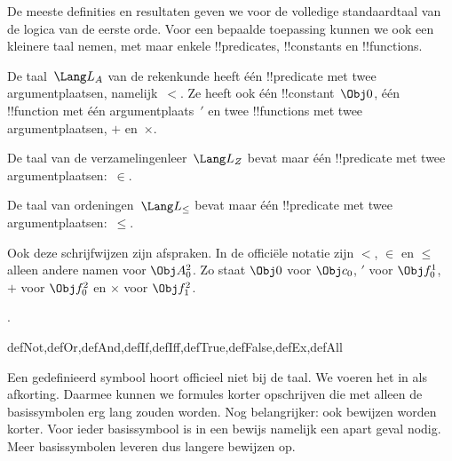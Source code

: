 \documentclass[../../../include/open-logic-section]{subfiles}
\begin{document}
De meeste definities en resultaten geven we voor de volledige
standaardtaal van de logica van de eerste orde. Voor een bepaalde
toepassing kunnen we ook een kleinere taal nemen, met maar enkele
!!{predicate}s, !!{constant}s en !!{function}s.

\begin{ex}
De taal~$\Lang L_A$ van de rekenkunde heeft één !!{predicate} met twee
argumentplaatsen, namelijk~$<$. Ze heeft ook één !!{constant}~$\Obj 0$,
één !!{function} met één argumentplaats~$\prime$ en twee !!{function}s
met twee argumentplaatsen, $+$ en~$\times$.
\end{ex}

\begin{ex}
De taal van de verzamelingenleer~$\Lang L_Z$ bevat maar één
!!{predicate} met twee argumentplaatsen:~$\in$.
\end{ex}

\begin{ex}
De taal van ordeningen~$\Lang L_\le$ bevat maar één !!{predicate} met
twee argumentplaatsen:~$\le$.
\end{ex}

Ook deze schrijfwijzen zijn afspraken. In de officiële notatie zijn
$<$, $\in$ en $\le$ alleen andere namen voor $\Obj A^2_0$. Zo staat
$\Obj 0$ voor $\Obj c_0$, $\prime$ voor $\Obj f^1_0$, $+$ voor
$\Obj f^2_0$ en $\times$ voor $\Obj f^2_1$.

.

\begin{tagblock}{defNot,defOr,defAnd,defIf,defIff,defTrue,defFalse,defEx,defAll}
\begin{explain}
Een gedefinieerd symbool hoort officieel niet bij de taal. We voeren
het in als afkorting. Daarmee kunnen we formules korter opschrijven die
met alleen de basissymbolen erg lang zouden worden. Nog belangrijker:
ook bewijzen worden korter. Voor ieder basissymbool is in een bewijs
namelijk een apart geval nodig. Meer basissymbolen leveren dus langere
bewijzen op.
\end{explain}
\end{tagblock}
\end{document}
